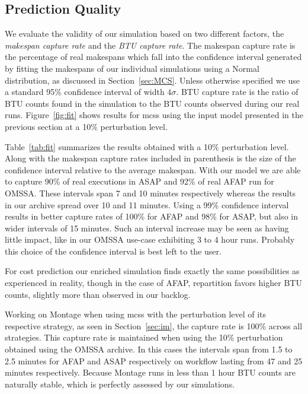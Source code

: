 \documentclass[10pt,conference,compsocconf]{IEEEtran}
\begin{document}
\subsection{Prediction Quality}\label{sec:pq}

We evaluate the  validity of our simulation based on  two different factors, the
\emph{makespan capture  rate} and  the \emph{BTU capture rate}.   The makespan
capture rate is the percentage of  real makespans which fall into the confidence
interval generated by fitting the  makespans of our individual simulations using
a Normal distribution, as  discussed in Section~\ref{sec:MCS}.  Unless otherwise
specified we  use a standard 95\%  confidence interval of width  $4\sigma$.  BTU
capture rate is the ratio of BTU counts found in the simulation to the BTU
counts observed  during our  real runs.  Figure~\ref{fig:fit} shows  results for
\acp{mcs} using  the input  model presented  in the previous  section at  a 10\%
perturbation level.

Table~\ref{tab:fit}  summarizes the  results obtained  with a  10\% perturbation
level. Along with the makespan capture rates included in parenthesis is the size
of the confidence interval relative to  the average makespan.  With our model we
are able to  capture 90\% of real executions  in ASAP and 92\% of  real AFAP run
for OMSSA\@.  These intervals  span 7  and 10  minutes respectively  whereas the
results in our archive  spread over 10 and 11 minutes.   Using a 99\% confidence
interval results in  better capture rates of  100\% for AFAP and  98\% for ASAP,
but also  in wider intervals  of 15 minutes.  Such  an interval increase  may be
seen as having little impact, like in  our OMSSA use-case exhibiting 3 to 4 hour
runs. Probably this choice of the confidence interval is best left to the user.

For cost prediction our enriched  simulation finds exactly the same possibilities
as experienced in reality, though in  the case of AFAP, repartition favors higher
BTU counts, slightly more than observed in our backlog.

Working on Montage when using \acp{mcs} with the perturbation level of its
respective strategy, as seen in Section~\ref{sec:im}, the capture rate is 100\%
across all strategies. This capture rate is maintained when using the 10\%
perturbation obtained using the OMSSA archive. In this cases the intervals span
from 1.5 to 2.5 minutes for AFAP and ASAP respectively on workflow lasting from
47 and 25 minutes respectively. Because Montage runs in less than 1 hour BTU 
counts are naturally stable, which is perfectly assessed by our simulations.
\end{document}
